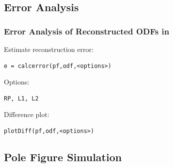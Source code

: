\subsection*{Error Analysis}

\begin{frame}[fragile]
  \frametitle{Error Analysis of Reconstructed ODFs in  \MTEX}

Estimate reconstruction error:
\begin{lstlisting}
e = calcerror(pf,odf,<options>)
\end{lstlisting}

Options:
\begin{lstlisting}
RP, L1, L2
\end{lstlisting}

Difference plot:
\begin{lstlisting}
plotDiff(pf,odf,<options>)
\end{lstlisting}


\vspace{3mm}

\end{frame}

\subsection*{Pole Figure Simulation}

